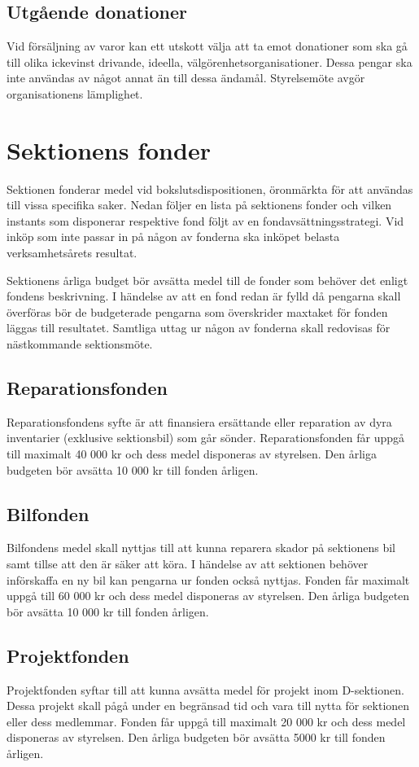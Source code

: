 \documentclass{dsekprotokoll}
\begin{document}
\subsection{Utgående donationer}
Vid försäljning av varor kan ett utskott välja att ta emot donationer som ska gå
till olika ickevinst drivande, ideella, välgörenhetsorganisationer. Dessa
pengar ska inte användas av något annat än till dessa ändamål. Styrelsemöte
avgör organisationens lämplighet.

\section{Sektionens fonder}
Sektionen fonderar medel vid bokslutsdispositionen, öronmärkta för att användas
till vissa specifika saker. Nedan följer en lista på sektionens fonder och
vilken instants som disponerar respektive fond följt av en
fondavsättningsstrategi. Vid inköp som inte passar in på någon av fonderna ska
inköpet belasta verksamhetsårets resultat.

Sektionens årliga budget bör avsätta medel till de fonder som behöver det enligt
fondens beskrivning. I händelse av att en fond redan är fylld då pengarna
skall överföras bör de budgeterade pengarna som överskrider maxtaket för
fonden läggas till resultatet. Samtliga uttag ur någon av fonderna skall
redovisas för nästkommande sektionsmöte.

\subsection{Reparationsfonden}
Reparationsfondens syfte är att finansiera ersättande eller reparation av dyra
inventarier (exklusive sektionsbil) som går sönder. Reparationsfonden får
uppgå till maximalt 40 000 kr och dess medel disponeras av styrelsen. Den årliga
budgeten bör avsätta 10 000 kr till fonden årligen.

\subsection{Bilfonden}
Bilfondens medel skall nyttjas till att kunna reparera skador på sektionens bil
samt tillse att den är säker att köra. I händelse av att sektionen behöver
införskaffa en ny bil kan pengarna ur fonden också nyttjas. Fonden får maximalt
uppgå till 60 000 kr och dess medel disponeras av styrelsen. Den årliga budgeten
bör avsätta 10 000 kr till fonden årligen.

\subsection{Projektfonden}
Projektfonden syftar till att kunna avsätta medel för projekt inom
D-sektionen. Dessa projekt skall pågå under en begränsad tid och vara till nytta
för sektionen eller dess medlemmar. Fonden får uppgå till maximalt 20 000 kr
och dess medel disponeras av styrelsen. Den årliga budgeten bör avsätta 5000
kr till fonden årligen.
\end{document}
